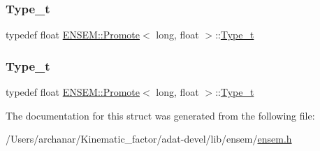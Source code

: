 \mbox{\label{structENSEM_1_1Promote_3_01long_00_01float_01_4_a465824ec9d8cc7704bf91ba4cdeafaad}} 
\subsubsection{\texorpdfstring{Type\_t}{Type\_t}\hspace{0.1cm}{\footnotesize\ttfamily [2/3]}}
{\footnotesize\ttfamily typedef float \mbox{\hyperlink{structENSEM_1_1Promote}{E\+N\+S\+E\+M\+::\+Promote}}$<$ long, float $>$\+::\mbox{\hyperlink{structENSEM_1_1Promote_3_01long_00_01float_01_4_a465824ec9d8cc7704bf91ba4cdeafaad}{Type\+\_\+t}}}

\mbox{\label{structENSEM_1_1Promote_3_01long_00_01float_01_4_a465824ec9d8cc7704bf91ba4cdeafaad}} 
\subsubsection{\texorpdfstring{Type\_t}{Type\_t}\hspace{0.1cm}{\footnotesize\ttfamily [3/3]}}
{\footnotesize\ttfamily typedef float \mbox{\hyperlink{structENSEM_1_1Promote}{E\+N\+S\+E\+M\+::\+Promote}}$<$ long, float $>$\+::\mbox{\hyperlink{structENSEM_1_1Promote_3_01long_00_01float_01_4_a465824ec9d8cc7704bf91ba4cdeafaad}{Type\+\_\+t}}}



The documentation for this struct was generated from the following file\+:\begin{DoxyCompactItemize}
\item 
/\+Users/archanar/\+Kinematic\+\_\+factor/adat-\/devel/lib/ensem/\mbox{\hyperlink{adat-devel_2lib_2ensem_2ensem_8h}{ensem.\+h}}\end{DoxyCompactItemize}
